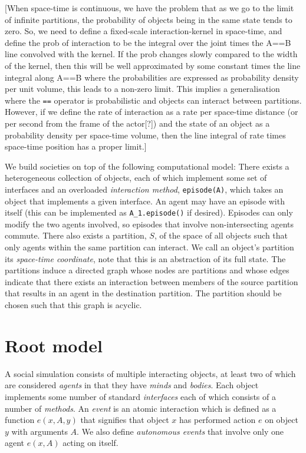 \documentclass[a4paper]{article}
\begin{document}
[When space-time is continuous, we have the problem that as we go to the limit of infinite partitions, the probability of objects being in the same state tends to zero. So, we need to define a fixed-scale interaction-kernel in space-time, and define the prob of interaction to be the integral over the joint times the A==B line convolved with the kernel. If the prob changes slowly compared to the width of the kernel, then this will be well approximated by some constant times the line integral along A==B where the probabilities are expressed as probability density per unit volume, this leads to a non-zero limit. This implies a generalisation where the \texttt{==} operator is probabilistic and objects can interact between partitions. However, if we define the rate of interaction as a rate per space-time distance (or per second from the frame of the actor[?]) and the state of an object as a probability density per space-time volume, then the line integral of rate times space-time position has a proper limit.]


We build societies on top of the following computational model: There exists a heterogeneous collection of objects, each of which implement some set of interfaces and an overloaded \textit{interaction method}, \texttt{episode(A)}, which takes an object that implements a given interface. An agent may have an episode with itself (this can be implemented as \texttt{A_1.episode()} if desired). Episodes can only modify the two agents involved, so episodes that involve non-intersecting agents commute. There also exists a partition, $S$, of the space of all objects such that only agents within the same partition can interact. We call an object's partition its \textit{space-time coordinate}, note that this is an abstraction of its full state. The partitions induce a directed graph whose nodes are partitions and whose edges indicate that there exists an interaction between members of the source partition that results in an agent in the destination partition. The partition should be chosen such that this graph is acyclic. 



\section{Root model}

A social simulation consists of multiple interacting objects, at least two of which are considered \textit{agents} in that they have \textit{minds} and \textit{bodies}. Each object implements some number of standard \textit{interfaces} each of which consists of a number of \textit{methods}. An \textit{event} is an atomic interaction which is defined as a function $e(x,A,y)$ that signifies that object $x$ has performed action $e$ on object $y$ with arguments $A$. We also define \textit{autonomous events} that involve only one agent $e(x,A)$ acting on itself.
\end{document}
